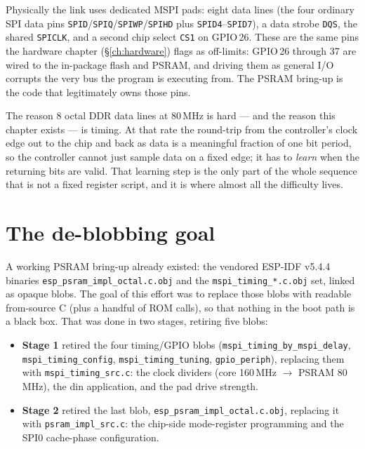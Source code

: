 Physically the link uses dedicated MSPI pads: eight data lines (the four ordinary
SPI data pins \texttt{SPID}/\texttt{SPIQ}/\texttt{SPIWP}/\texttt{SPIHD} plus
\texttt{SPID4}--\texttt{SPID7}), a data strobe \texttt{DQS}, the shared
\texttt{SPICLK}, and a second chip select \texttt{CS1} on GPIO\,26. These are the
same pins the hardware chapter (\S\ref{ch:hardware}) flags as off-limits: GPIO\,26
through 37 are wired to the in-package flash and PSRAM, and driving them as general
I/O corrupts the very bus the program is executing from. The PSRAM bring-up is the
code that legitimately owns those pins.

The reason 8 octal DDR data lines at 80\,MHz is hard --- and the reason this chapter
exists --- is timing. At that rate the round-trip from the controller's clock edge
out to the chip and back as data is a meaningful fraction of one bit period, so the
controller cannot just sample data on a fixed edge; it has to \emph{learn} when the
returning bits are valid. That learning step is the only part of the whole sequence
that is not a fixed register script, and it is where almost all the difficulty lives.

\section{The de-blobbing goal}

A working PSRAM bring-up already existed: the vendored ESP-IDF v5.4.4 binaries
\texttt{esp\_psram\_impl\_octal.c.obj} and the \texttt{mspi\_timing\_*.c.obj} set,
linked as opaque blobs. The goal of this effort was to replace those blobs with
readable from-source C (plus a handful of ROM calls), so that nothing in the boot
path is a black box. That was done in two stages, retiring five blobs:

\begin{itemize}
\item \textbf{Stage 1} retired the four timing/GPIO blobs
(\texttt{mspi\_timing\_by\_mspi\_delay}, \texttt{mspi\_timing\_config},
\texttt{mspi\_timing\_tuning}, \texttt{gpio\_periph}), replacing them with
\texttt{mspi\_timing\_src.c}: the clock dividers (core 160\,MHz $\rightarrow$ PSRAM
80\,MHz), the din application, and the pad drive strength.
\item \textbf{Stage 2} retired the last blob,
\texttt{esp\_psram\_impl\_octal.c.obj}, replacing it with
\texttt{psram\_impl\_src.c}: the chip-side mode-register programming and the SPI0
cache-phase configuration.
\end{itemize}

